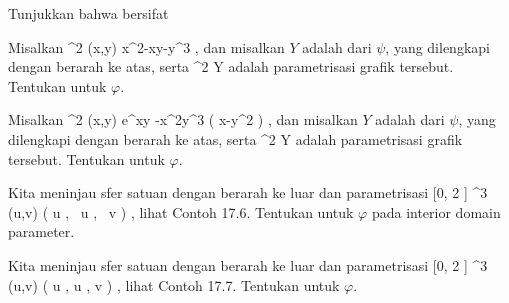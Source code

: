 \setcounter{section}{19}


{}
{

Tunjukkan bahwa
bersifat

}
{} {}

{}
{

Misalkan
\maabbeledisp {\psi} {\R^2} {\R
} {(x,y)} { x^2-xy-y^3
} {,}
dan misalkan $Y$ adalah
dari $\psi$, yang dilengkapi dengan
berarah ke atas, serta
 {\R^2} {Y
} {}
adalah parametrisasi grafik tersebut. Tentukan
untuk $\varphi$.

}
{} {}

{}
{

Misalkan
\maabbeledisp {\psi} {\R^2} {\R
} {(x,y)} { e^{xy} -x^2y^3  \sin  \left(  x-y^2 \right)
} {,}
dan misalkan $Y$ adalah
dari $\psi$, yang dilengkapi dengan
berarah ke atas, serta
 {\R^2} {Y
} {}
adalah parametrisasi grafik tersebut. Tentukan
untuk $\varphi$.

}
{} {}

{}
{

Kita meninjau sfer satuan dengan
berarah ke luar dan parametrisasi
\maabbeledisp {\varphi} {[0, 2 \pi] \times [-1,1]} {\R^3
} {(u,v)} { \left(    \cos  u   , \,     \sin  u  , \,   v                 \right)
} {,}
lihat
Contoh 17.6.
Tentukan
untuk $\varphi$ pada interior domain parameter.

}
{} {}

{}
{

Kita meninjau sfer satuan dengan
berarah ke luar dan parametrisasi
\maabbeledisp {\varphi} {[0, 2 \pi] \times \R} {\R^3
} {(u,v)} { {  }  ( \cos  u  ,  \sin  u  , v )
} {,}
lihat
Contoh 17.7.
Tentukan
untuk $\varphi$.

}
{} {}

